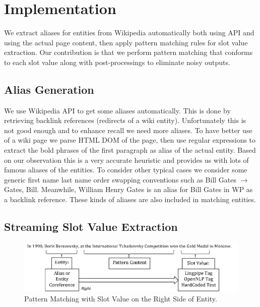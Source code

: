 

\section{Implementation}
\label{section:implementation}

We extract aliases for entities from Wikipedia automatically both using API 
and using the actual page content, then apply pattern matching rules for slot 
value extraction. Our contribution is that we perform pattern matching that conforms to each slot 
value along with post-processings to eliminate noisy outputs. 


\subsection{Alias Generation}
\label{section:aliasgeneration}

We use Wikipedia API to get some aliases automatically. This is done by 
retrieving backlink references (redirects of a wiki entity). Unfortunately 
this is not good enough and to enhance recall we need more aliases. To have 
better use of a wiki page we parse HTML DOM of the page, then use regular 
expressions to extract the bold phrases of the first paragraph as alias of the 
actual entity. Based on our observation this is a very accurate heuristic and 
provides us with lots of famous aliases of the entities. To consider other 
typical cases we consider some generic first name last name order swapping 
conventions such as Bill Gates $\rightarrow$ Gates, Bill.  Meanwhile, William Henry Gates is an alias for Bill Gates in WP as a backlink reference. These kinds of aliases are also included in matching entities. 

\subsection{Streaming Slot Value Extraction}

\begin{figure}
\centering
\includegraphics[width=6in]{./images/Pattern-eps-converted-to.pdf}
\vspace*{-.1in} \caption{Pattern Matching with Slot Value on the Right Side of Entity. }\label{fig:pattern}
\vspace*{-.2in}
\end{figure}

